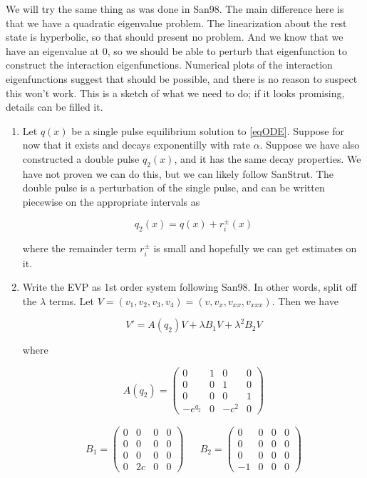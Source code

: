 \documentclass[12pt]{article}
\begin{document}
We will try the same thing as was done in San98. The main difference here is that we have a quadratic eigenvalue problem. The linearization about the rest state is hyperbolic, so that should present no problem. And we know that we have an eigenvalue at 0, so we should be able to perturb that eigenfunction to construct the interaction eigenfunctions. Numerical plots of the interaction eigenfunctions suggest that should be possible, and there is no reason to suspect this won't work. This is a sketch of what we need to do; if it looks promising, details can be filled it.

\begin{enumerate}

\item Let $q(x)$ be a single pulse equilibrium solution to \eqref{eqODE}. Suppose for now that it exists and decays exponentilly with rate $\alpha$. Suppose we have also constructed a double pulse $q_2(x)$, and it has the same decay properties. We have not proven we can do this, but we can likely follow SanStrut. The double pulse is a perturbation of the single pulse, and can be written piecewise on the appropriate intervals as

\[
q_2(x) = q(x) + r_i^\pm(x)
\]

where the remainder term $r_i^\pm$ is small and hopefully we can get estimates on it.

\item Write the EVP as 1st order system following San98. In other words, split off the $\lambda$ terms. Let $V = (v_1, v_2, v_3, v_4) = (v, v_x, v_{xx}, v_{xxx})$. Then we have

\begin{equation}\label{splitevp}
V' = A(q_2)V + \lambda B_1 V + \lambda^2 B_2 V
\end{equation}

where

\begin{equation}
A(q_2) = \begin{pmatrix}
0 & 1 & 0 & 0 \\
0 & 0 & 1 & 0 \\
0 & 0 & 0 & 1 \\
-e^{q_2} & 0 & -c^2 & 0 
\end{pmatrix}
\end{equation}

\begin{align*}
B_1 = \begin{pmatrix}
0 & 0 & 0 & 0 \\
0 & 0 & 0 & 0 \\
0 & 0 & 0 & 0 \\
0 & 2 c & 0 & 0 
\end{pmatrix} &&
B_2 = \begin{pmatrix}
0 & 0 & 0 & 0 \\
0 & 0 & 0 & 0 \\
0 & 0 & 0 & 0 \\
-1 & 0 & 0 & 0 
\end{pmatrix}
\end{align*}


\end{enumerate}
\end{document}
